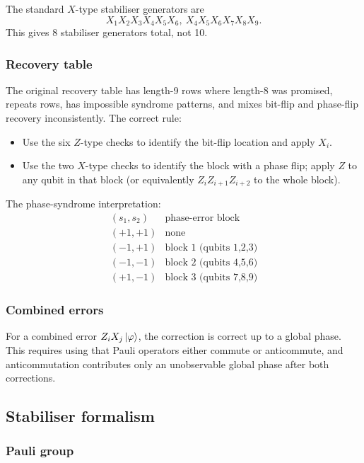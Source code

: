 \documentclass[12pt]{article}
\theoremstyle{plain}
\theoremstyle{definition}
\begin{document}
The standard $X$-type stabiliser generators are
\[
X_1X_2X_3X_4X_5X_6,\ X_4X_5X_6X_7X_8X_9.
\]
This gives 8 stabiliser generators total, not 10.

\subsubsection*{Recovery table}

The original recovery table has length-9 rows where length-8 was promised, repeats rows, has impossible syndrome patterns, and mixes bit-flip and phase-flip recovery inconsistently. The correct rule:
\begin{itemize}
\item Use the six $Z$-type checks to identify the bit-flip location and apply $X_i$.
\item Use the two $X$-type checks to identify the block with a phase flip; apply $Z$ to any qubit in that block (or equivalently $Z_iZ_{i+1}Z_{i+2}$ to the whole block).
\end{itemize}
The phase-syndrome interpretation:
\[
\begin{array}{c|c}
(s_1,s_2) & \text{phase-error block}\\\hline
(+1,+1) & \text{none}\\
(-1,+1) & \text{block 1 (qubits 1,2,3)}\\
(-1,-1) & \text{block 2 (qubits 4,5,6)}\\
(+1,-1) & \text{block 3 (qubits 7,8,9)}
\end{array}
\]

\subsubsection*{Combined errors}

For a combined error $Z_iX_j\ket{\varphi}$, the correction is correct up to a global phase. This requires using that Pauli operators either commute or anticommute, and anticommutation contributes only an unobservable global phase after both corrections.

\subsection{Stabiliser formalism}

\subsubsection*{Pauli group}
\end{document}

